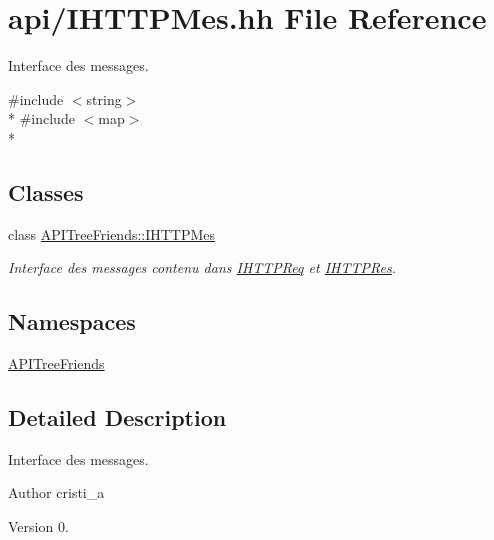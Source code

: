 \hypertarget{_i_h_t_t_p_mes_8hh}{}\section{api/\+I\+H\+T\+T\+P\+Mes.hh File Reference}
\label{_i_h_t_t_p_mes_8hh}


Interface des messages.  


{\ttfamily \#include $<$string$>$}\\*
{\ttfamily \#include $<$map$>$}\\*
\subsection*{Classes}
\begin{DoxyCompactItemize}
\item 
class \hyperlink{class_a_p_i_tree_friends_1_1_i_h_t_t_p_mes}{A\+P\+I\+Tree\+Friends\+::\+I\+H\+T\+T\+P\+Mes}
\begin{DoxyCompactList}\small\item\em Interface des messages contenu dans \hyperlink{class_a_p_i_tree_friends_1_1_i_h_t_t_p_req}{I\+H\+T\+T\+P\+Req} et \hyperlink{class_a_p_i_tree_friends_1_1_i_h_t_t_p_res}{I\+H\+T\+T\+P\+Res}. \end{DoxyCompactList}\end{DoxyCompactItemize}
\subsection*{Namespaces}
\begin{DoxyCompactItemize}
\item 
 \hyperlink{namespace_a_p_i_tree_friends}{A\+P\+I\+Tree\+Friends}
\end{DoxyCompactItemize}


\subsection{Detailed Description}
Interface des messages. 

\begin{DoxyAuthor}{Author}
cristi\+\_\+a 
\end{DoxyAuthor}
\begin{DoxyVersion}{Version}
0. 
\end{DoxyVersion}
